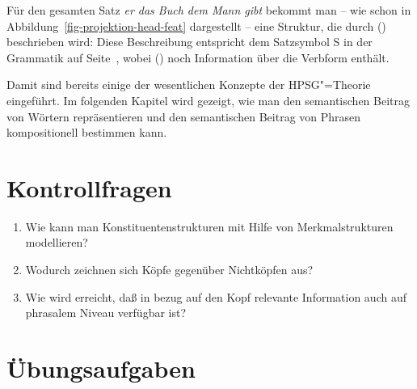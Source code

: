 \noindent
Für den gesamten Satz \emph{er das Buch dem Mann gibt} bekommt man -- wie schon in
Abbildung~\ref{fig-projektion-head-feat} dargestellt -- eine Struktur, die durch ()
beschrieben wird:
\ea
{}
\z
Diese Beschreibung entspricht dem Satzsymbol S in der Grammatik auf
Seite~\pageref{bsp-grammatik-psg}, wobei () noch Information über die Verbform enthält.


Damit sind bereits einige der wesentlichen Konzepte der HPSG"=Theorie eingeführt. Im folgenden
Kapitel wird gezeigt, wie man den semantischen Beitrag von Wörtern repräsentieren und den
semantischen Beitrag von Phrasen kompositionell bestimmen kann.






\section*{Kontrollfragen}


\begin{enumerate}
\item Wie kann man Konstituentenstrukturen mit Hilfe von Merkmalstrukturen modellieren?
\item Wodurch zeichnen sich Köpfe gegenüber Nichtköpfen aus?
\item Wie wird erreicht, daß in bezug auf den Kopf relevante Information auch auf phrasalem
      Niveau verfügbar ist?
\end{enumerate}

\section*{Übungsaufgaben}

